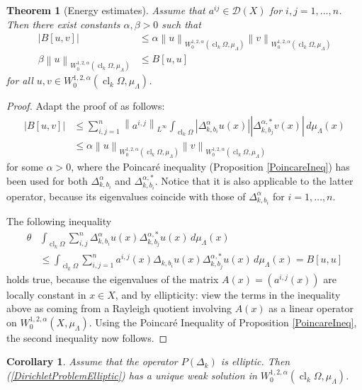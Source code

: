 \documentclass[a4paper,draft]{ZbRad}
\theoremstyle{plain}
\newtheorem{thm}{Theorem}[section]
\newtheorem{cor}{Corollary}[section]
\theoremstyle{definition}
\numberwithin{equation}{section}
\renewcommand{\le}{\leqslant}\renewcommand{\leq}{\leqslant}
\newcommand{\absolute}[1]{\left\lvert#1\right\rvert}
\newcommand{\norm}[1]{\left\|#1\right\|}
\DeclareMathOperator{\closure}{cl}
\begin{document}
\begin{thm}[Energy estimates]
Assume that $a^{ij}\in \mathcal{D}(X)$ for $i,j=1,\dots,n$.
Then there exist constants $\alpha,\beta > 0$ such that
\begin{align*}
\absolute{B[u,v]}&\le\alpha\norm{u}_{W_0^{1,2,\alpha}(\closure_k\Omega,\mu_\Lambda)}\norm{v}_{W_0^{1,2,\alpha}(\closure_k\Omega,\mu_\Lambda)}
\\
\beta\norm{u}_{W_0^{1,2,\alpha}(\closure_k\Omega,\mu_\Lambda)}&\le B[u,u]
\end{align*}
for all $u,v\in W_0^{1,2,\alpha}(\closure_k\Omega,\mu_\Lambda)$.
\end{thm}

\begin{proof}
Adapt the proof of \cite[Theorem 5.3]{ellipticBVP} as follows:
\begin{align*}
\absolute{B[u,v]}&\le
\sum\limits_{i,j=1}^n \norm{a^{i,j}}_{L^\infty}
\int_{\closure_k\Omega}\absolute{\Delta_{k,b_i}^\alpha u(x)}\absolute{\Delta_{k,b_j}^{\alpha,*}v(x)}\,d\mu_\Lambda(x)
\\
&\le\alpha\norm{u}_{W_0^{1,2,\alpha}(\closure_k\Omega,\mu_\Lambda)}\norm{v}_{W_0^{1,2,\alpha}(\closure_k\Omega,\mu_\Lambda)}
\end{align*}
for some $\alpha>0$, where the Poincar\'e inequality (Proposition \ref{PoincareIneq}) has been used for both $\Delta_{k,b_i}^\alpha$ and $\Delta_{k,b_i}^{\alpha,*}$. Notice that it is also applicable to the latter operator, because its eigenvalues coincide with those of $\Delta^\alpha_{k,b_i}$ for $i=1,\dots,n$.

\smallskip
The following inequality 
\begin{align*}
\theta&\int_{\closure_k\Omega}
\sum\limits_{i,j}^n\Delta_{k,b_i}^\alpha u(x)\Delta_{k,b_j}^{\alpha,*}u(x)\,d\mu_\Lambda(x)
\\
&\le\int_{\closure_k\Omega}\sum\limits_{i,j=1}^n a^{i,j}(x)\Delta_{k,b_i}u(x)\Delta_{k,b_j}^{\alpha,*}u(x)\,d\mu_\Lambda(x)=B[u,u]
\end{align*}
holds true, because the eigenvalues of the matrix $A(x)=(a^{i,j}(x))$ are locally constant in $x\in X$, and by ellipticity: 
view the terms in the inequality above as coming from a Rayleigh quotient involving $A(x)$ as a linear operator on $W_0^{1,2,\alpha}(X,\mu_\Lambda)$. Using the Poincar\'e Inequality of Proposition \ref{PoincareIneq}, the second inequality now follows.
\end{proof}

\begin{cor}
Assume that the operator $P(\Delta_k)$ is elliptic. Then (\ref{DirichletProblemElliptic}) has a unique weak
solution in $W_0^{1,2,\alpha}(\closure_k\Omega,\mu_\Lambda)$.
\end{cor}
\end{document}
